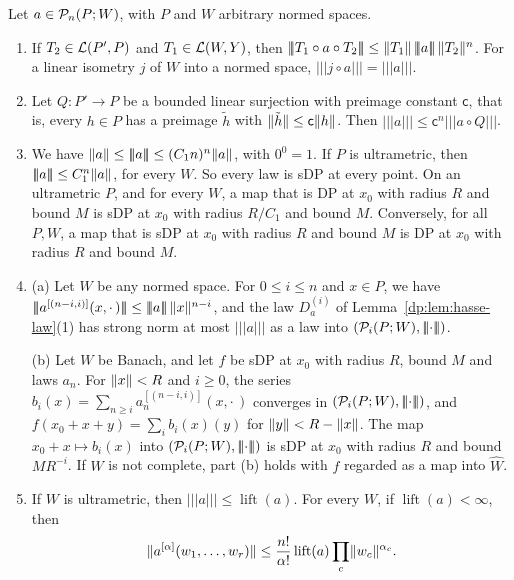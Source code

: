 \begin{lemma}\label{dp:lem:strong-formal}
Let $a\in\mathcal P_n(P;W)$, with $P$ and $W$ arbitrary normed spaces.
\begin{enumerate}
\item If $T_2\in\mathcal L(P',P)$ and $T_1\in\mathcal L(W,Y)$, then $\lvert\!\lvert\!\lvert T_1\circ a\circ T_2\rvert\!\rvert\!\rvert\le\norm{T_1}\,\lvert\!\lvert\!\lvert a\rvert\!\rvert\!\rvert\,\norm{T_2}^n$. For a linear isometry $j$ of $W$ into a normed space, $\lvert\!\lvert\!\lvert j\circ a\rvert\!\rvert\!\rvert=\lvert\!\lvert\!\lvert a\rvert\!\rvert\!\rvert$.
\item Let $Q\colon P'\to P$ be a bounded linear surjection with preimage constant $\mathsf c$, that is, every $h\in P$ has a preimage $\tilde h$ with $\lVert \tilde h\rVert\le\mathsf c\lVert h\rVert$. Then $\lvert\!\lvert\!\lvert a\rvert\!\rvert\!\rvert\le\mathsf c^n\lvert\!\lvert\!\lvert a\circ Q\rvert\!\rvert\!\rvert$.
\item We have $\lVert a\rVert\le\lvert\!\lvert\!\lvert a\rvert\!\rvert\!\rvert\le(C_1n)^n\lVert a\rVert$, with $0^0=1$. If $P$ is ultrametric, then $\lvert\!\lvert\!\lvert a\rvert\!\rvert\!\rvert\le C_1^n\lVert a\rVert$, for every $W$. So every law is sDP at every point. On an ultrametric $P$, and for every $W$, a map that is DP at $x_0$ with radius $R$ and bound $M$ is sDP at $x_0$ with radius $R/C_1$ and bound $M$. Conversely, for all $P,W$, a map that is sDP at $x_0$ with radius $R$ and bound $M$ is DP at $x_0$ with radius $R$ and bound $M$.
\item (a) Let $W$ be any normed space. For $0\le i\le n$ and $x\in P$, we have $\lvert\!\lvert\!\lvert a^{[(n-i,i)]}(x,\cdot\,)\rvert\!\rvert\!\rvert\le\lvert\!\lvert\!\lvert a\rvert\!\rvert\!\rvert\,\norm x^{n-i}$, and the law $D^{(i)}_a$ of Lemma~\ref{dp:lem:hasse-law}(1) has strong norm at most $\lvert\!\lvert\!\lvert a\rvert\!\rvert\!\rvert$ as a law into $(\mathcal P_i(P;W),\lvert\!\lvert\!\lvert\cdot\rvert\!\rvert\!\rvert)$.

(b) Let $W$ be Banach, and let $f$ be sDP at $x_0$ with radius $R$, bound $M$ and laws $a_n$. For $\lVert x\rVert<R$ and $i\ge0$, the series $b_i(x)=\sum_{n\ge i}a_n^{[(n-i,i)]}(x,\cdot\,)$ converges in $(\mathcal P_i(P;W),\lvert\!\lvert\!\lvert\cdot\rvert\!\rvert\!\rvert)$, and $f(x_0+x+y)=\sum_ib_i(x)(y)$ for $\lVert y\rVert<R-\lVert x\rVert$. The map $x_0+x\mapsto b_i(x)$ into $(\mathcal P_i(P;W),\lvert\!\lvert\!\lvert\cdot\rvert\!\rvert\!\rvert)$ is sDP at $x_0$ with radius $R$ and bound $MR^{-i}$. If $W$ is not complete, part (b) holds with $f$ regarded as a map into $\widehat W$.
\item If $W$ is ultrametric, then $\lvert\!\lvert\!\lvert a\rvert\!\rvert\!\rvert\le\operatorname{lift}(a)$. For every $W$, if $\operatorname{lift}(a)<\infty$, then
\[
 \lVert a^{[\alpha]}(w_1,\dots,w_r)\rVert\le\frac{n!}{\alpha!}\operatorname{lift}(a)\prod_c\lVert w_c\rVert^{\alpha_c}.
\]
\end{enumerate}
\end{lemma}

